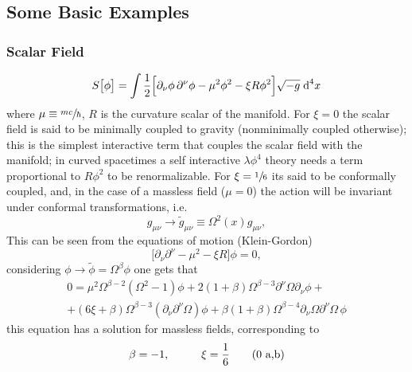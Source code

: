 \subsection{Some Basic Examples}
\subsubsection{Scalar Field}
\begin{equation}\label{eq: General scalar field action}
	S\big[\phi\big]=\int\frac{1}{2}\Big[\partial_\nu\phi\,\partial^\nu\phi-\mu^2\phi^2-\xi R\phi^2\Big]\sqrt{-g}\;\text{d}^4 x
\end{equation}
where $\mu\equiv\sfrac{m c}{\hbar}$, $R$ is the curvature scalar of the manifold. For $\xi=0$ the scalar field is said to be minimally coupled to gravity (nonminimally coupled otherwise); this is the simplest interactive term that couples the scalar field with the manifold; in curved spacetimes \cite{Bunch_Renorm} a self interactive $\lambda\phi^4$ theory needs a term proportional to $R\phi^2$ to be renormalizable. For $\xi=\sfrac{1}{6}$ its said to be conformally coupled, and, in the case of a massless field ($\mu=0$) the action will be invariant under conformal transformations, i.e.
\begin{equation}
	g_{\mu\nu}\rightarrow \tilde{g}_{\mu\nu}\equiv \Omega^2(x)g_{\mu\nu},
\end{equation}
This can be seen from the equations of motion (Klein-Gordon)
\begin{equation}
	\big[\partial_\nu\partial^\nu-\mu^2-\xi R\big]\phi=0,
\end{equation}
considering $\phi\rightarrow\tilde{\phi}=\Omega^\beta\phi$ one gets that
\begin{multline}
	0=\mu^2\Omega^{\beta-2}\left(\Omega^2-1\right)\phi+2\left(1+\beta\right)\Omega^{\beta-3}\partial^\nu\Omega\partial_\nu\phi+\\
	+(6\xi+\beta)\Omega^{\beta-3}\left(\partial_\nu\partial^\nu\Omega\right)\phi+\beta(1+\beta)\Omega^{\beta-4}\partial_\nu\Omega\partial^\nu\Omega\,\phi
\end{multline}
this equation has a solution for massless fields, corresponding to
\begin{subequations}
	\begin{gather}
		\beta=-1,\hspace{1.0cm} \xi=\frac{1}{6}\tag{\theequation \,\,a,b}
	\end{gather}
\end{subequations}

